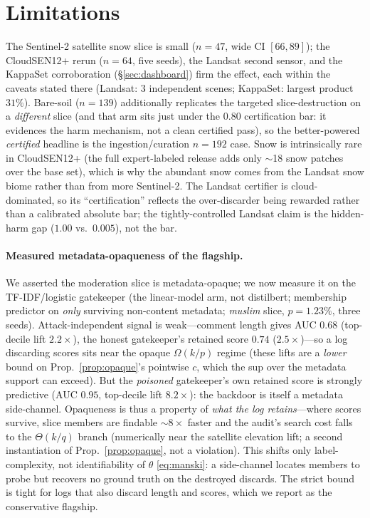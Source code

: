 \documentclass[conference]{IEEEtran}
\begin{document}
\section{Limitations}\label{sec:limits}
The Sentinel-2 satellite snow slice is small ($n{=}47$, wide CI $[66,89]$); the CloudSEN12+ rerun ($n{=}64$,
five seeds), the Landsat second sensor, and the KappaSet corroboration (\S\ref{sec:dashboard}) firm the effect,
each within the caveats stated there (Landsat: $3$ independent scenes; KappaSet: largest product $31\%$).
Bare-soil ($n{=}139$) additionally replicates the targeted
slice-destruction on a \emph{different} slice (and that arm sits just under the $0.80$
certification bar: it evidences the harm mechanism, not a clean certified pass), so the better-powered
\emph{certified} headline is the ingestion/curation $n{=}192$ case. Snow is intrinsically rare in CloudSEN12+
(the full expert-labeled release adds only $\sim$18 snow patches over the base set), which is why the abundant
snow comes from the Landsat snow biome rather than from more Sentinel-2. The Landsat certifier is
cloud-dominated, so its ``certification'' reflects the over-discarder being rewarded rather than a calibrated
absolute bar; the tightly-controlled Landsat claim is the hidden-harm gap ($1.00$ vs.\ $0.005$), not the bar.

\paragraph{Measured metadata-opaqueness of the flagship.} We asserted the moderation slice is metadata-opaque;
we now measure it on the TF-IDF/logistic gatekeeper (the linear-model arm, not distilbert; membership predictor
on \emph{only} surviving non-content metadata; \emph{muslim} slice, $p{=}1.23\%$, three seeds). Attack-independent
signal is weak---comment length gives AUC $0.68$ (top-decile lift $2.2\times$), the honest gatekeeper's retained
score $0.74$ ($2.5\times$)---so a log discarding scores sits near the opaque $\Omega(k/p)$ regime (these lifts
are a \emph{lower} bound on Prop.~\ref{prop:opaque}'s pointwise $c$, which the sup over the metadata support can
exceed). But the \emph{poisoned} gatekeeper's own retained score is
strongly predictive (AUC $0.95$, top-decile lift $8.2\times$): the backdoor is itself a metadata side-channel. Opaqueness is thus
a property of \emph{what the log retains}---where scores survive, slice members are findable $\sim$$8\times$
faster and the audit's search cost falls to the $\Theta(k/q)$ branch (numerically near the satellite
elevation lift; a second instantiation of Prop.~\ref{prop:opaque}, not a violation). This shifts only
label-complexity, not identifiability of $\theta$ \eqref{eq:manski}: a side-channel locates members to
probe but recovers no ground truth on the destroyed discards. The strict bound is tight for logs that also
discard length and scores, which we report as the conservative flagship.
\end{document}
